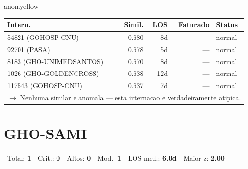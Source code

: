 \documentclass[a4paper,10pt]{article}
\begin{document}
\begin{anomalycard}[Internacao 12208 | GHO-REALGRANDEZA | MODERADO (z=2.01)]{anomyellow}
\begin{tabular}{l r r r l}\toprule\textbf{Intern.} & \textbf{Simil.} & \textbf{LOS} & \textbf{Faturado} & \textbf{Status} \\\midrule
54821 (GOHOSP-CNU) & 0.680 & 8d & --- & \textcolor{jcubeblue}{normal} \\
92701 (PASA) & 0.678 & 5d & --- & \textcolor{jcubeblue}{normal} \\
8183 (GHO-UNIMEDSANTOS) & 0.670 & 8d & --- & \textcolor{jcubeblue}{normal} \\
1026 (GHO-GOLDENCROSS) & 0.638 & 12d & --- & \textcolor{jcubeblue}{normal} \\
117543 (GOHOSP-CNU) & 0.637 & 7d & --- & \textcolor{jcubeblue}{normal} \\
\multicolumn{5}{l}{\textcolor{jcubeblue}{\small $\rightarrow$ Nenhuma similar e anomala --- esta internacao e verdadeiramente atipica.}} \\
\bottomrule\end{tabular}


\end{anomalycard}

\newpage

\clearpage
\section{GHO-SAMI}
\begin{tcolorbox}[colback=lightblue,colframe=jcubeblue,title={\textbf{Resumo --- GHO-SAMI}}]
\begin{tabular}{ll@{\quad}ll@{\quad}ll}
Total: \textbf{1} &
Crit.: \textcolor{anomred}{\textbf{0}} &
Altos: \textcolor{anomorange}{\textbf{0}} &
Mod.: \textcolor{anomyellow}{\textbf{1}} &
LOS med.: \textbf{6.0d} &
Maior z: \textbf{2.00} \\


\end{tabular}
\end{tcolorbox}
\end{document}

